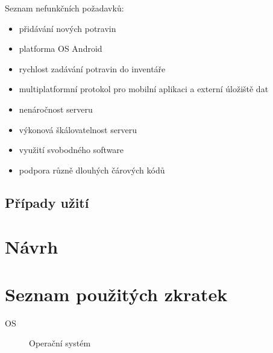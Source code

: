 \documentclass[thesis=B,czech]{FITthesis}[2013/10/20]
\begin{document}
Seznam nefunkčních požadavků:

\begin{itemize}
  \item přidávání nových potravin
  \item platforma OS Android
  \item rychlost zadávání potravin do inventáře
  \item multiplatformní protokol pro mobilní aplikaci a externí úložiště dat
  \item nenáročnost serveru
  \item výkonová škálovatelnost serveru
  \item využití svobodného software
  \item podpora různě dlouhých čárových kódů
\end{itemize}


\section{Případy užití}

\chapter{Návrh}

\begin{conclusion}
\end{conclusion}




\appendix

\chapter{Seznam použitých zkratek}
\begin{description}
	\item[OS] Operační systém
\end{description}
\end{document}
